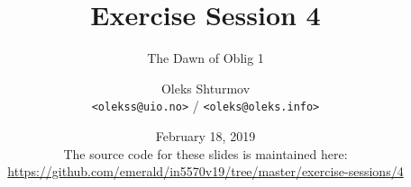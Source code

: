 \documentclass[xcolor=table]{beamer}
\title{{\Large Exercise Session 4}}
\subtitle{The Dawn of Oblig 1}
\institute{{\large University of Oslo}\\[0.2em] IN[59]570: Distributed Objects}
\author{Oleks Shturmov\\[-0.2em]%
  {\tiny \texttt{<olekss@uio.no>} / \texttt{<oleks@oleks.info>}}
}
\date{February 18, 2019\\[2em]
{\scriptsize The source code for these slides is maintained here: \\[-0.5em] {\tiny%
\url{https://github.com/emerald/in5570v19/tree/master/exercise-sessions/4}}%
}}
\begin{document}
\begin{frame} \titlepage \end{frame}






\end{document}
